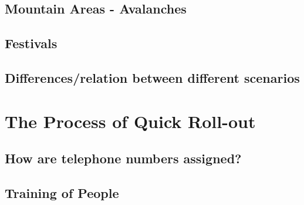 \subsection{Mountain Areas - Avalanches}

\subsection{Festivals}

\subsection{Differences/relation between different scenarios}




\section{The Process of Quick Roll-out}

\subsection{How are telephone numbers assigned?}

\subsection{Training of People}
